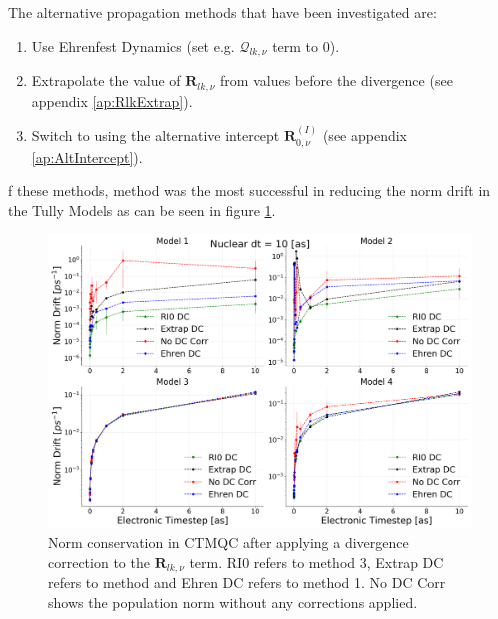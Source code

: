 \noindent The alternative propagation methods that have been investigated are:
\begin{enumerate}
	\item Use Ehrenfest Dynamics (set e.g. $\mathcal{Q}_{lk, \nu}$ term to 0).
	\item Extrapolate the value of $\mathbf{R}_{lk, \nu}$ from values before the divergence (see appendix \ref{ap:RlkExtrap}).
	\item Switch to using the alternative intercept $\mathbf{R}_{0, \nu}^{(I)}$ (see appendix \ref{ap:AltIntercept}).
\end{enumerate}
f these  methods, method  was the most successful in reducing the norm drift in the Tully Models as can be seen in figure \ref{fig:NormConsCorr}.
\begin{figure}[ht]
	\includegraphics[width=\textwidth]{../img/CTMQC/TullyModels/CTMQC_Norm_Conservation_wCorr.png}
	\caption{\label{fig:NormConsCorr}Norm conservation in CTMQC after applying a divergence correction to the $\mathbf{R}_{lk, \nu}$ term. RI0 refers to method 3, Extrap DC refers to method  and Ehren DC refers to method 1. No DC Corr shows the population norm without any corrections applied.}
\end{figure}
\\

